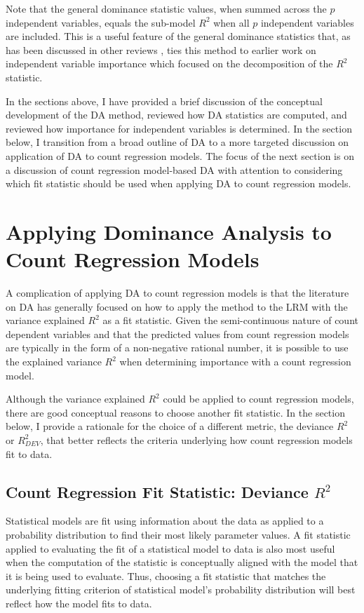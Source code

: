 \documentclass[man]{apa7}
\begin{document}
	Note that the general dominance statistic values, when summed across the $p$ independent variables, equals the sub-model $R^2$ when all $p$ independent variables are included.
	This is a useful feature of the general dominance statistics that, as has been discussed in other reviews \parencite{gromping2007estimators,johnson2004history}, ties this method to earlier work on independent variable importance which focused on the decomposition of the $R^2$ statistic.

	In the sections above, I have provided a brief discussion of the conceptual development of the DA method, reviewed how DA statistics are computed, and reviewed how importance for independent variables is determined.
	In the section below, I transition from a broad outline of DA to a more targeted discussion on application of DA to count regression models.
	The focus of the next section is on a discussion of count regression model-based DA with attention to considering which fit statistic should be used when applying DA to count regression models.
	
\section{Applying Dominance Analysis to Count Regression Models}

	A complication of applying DA to count regression models is that the literature on DA has generally focused on how to apply the method to the LRM with the variance explained $R^2$ as a fit statistic.
	Given the semi-continuous nature of count dependent variables and that the predicted values from count regression models are typically in the form of a non-negative rational number, it is possible to use the explained variance $R^2$ when determining importance with a count regression model.
	
	Although the variance explained $R^2$ could be applied to count regression models, there are good conceptual reasons to choose another fit statistic. 
	In the section below, I provide a rationale for the choice of a different metric, the deviance $R^2$ or $R^2_{DEV}$, that better reflects the criteria underlying how count regression models fit to data. 
	
	\subsection{Count Regression Fit Statistic: Deviance $R^2$} 
	
	Statistical models are fit using information about the data as applied to a probability distribution to find their most likely parameter values.
	A fit statistic applied to evaluating the fit of a statistical model to data is also most useful when the computation of the statistic is conceptually aligned with the model that it is being used to evaluate.
	Thus, choosing a fit statistic that matches the underlying fitting criterion of statistical model's probability distribution will best reflect how the model fits to data.
	
\end{document}
